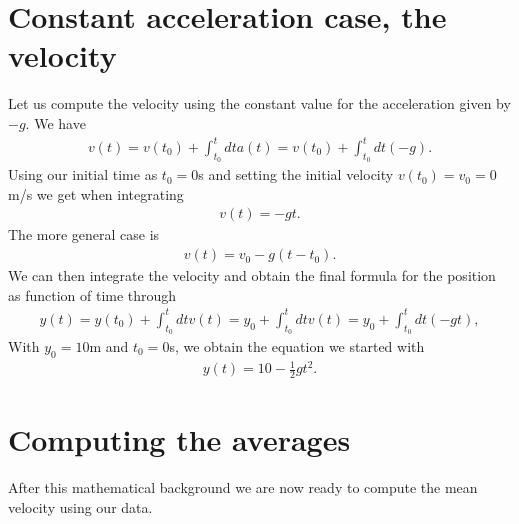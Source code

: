\documentclass[letterpaper,10pt,english]{sphinxmanual}
\begin{document}
\section{Constant acceleration case, the velocity}
\label{\detokenize{chapter1:constant-acceleration-case-the-velocity}}
Let us compute the velocity using the constant value for the acceleration given by \(-g\). We have
\begin{equation*}
\begin{split}
v(t)=v(t_0)+\int_{t_0}^t dt a(t)=v(t_0)+\int_{t_0}^t dt (-g).
\end{split}
\end{equation*}
Using our initial time as \(t_0=0\)s and setting the initial velocity \(v(t_0)=v_0=0\)m/s we get when integrating
\begin{equation*}
\begin{split}
v(t)=-gt.
\end{split}
\end{equation*}
The more general case is
\begin{equation*}
\begin{split}
v(t)=v_0-g(t-t_0).
\end{split}
\end{equation*}
We can then integrate the velocity and obtain the final formula for the position as function of time through
\begin{equation*}
\begin{split}
y(t)=y(t_0)+\int_{t_0}^t dt v(t)=y_0+\int_{t_0}^t dt v(t)=y_0+\int_{t_0}^t dt (-gt),
\end{split}
\end{equation*}
With \(y_0=10\)m and \(t_0=0\)s, we obtain the equation we started with
\begin{equation*}
\begin{split}
y(t)=10-\frac{1}{2}gt^2.
\end{split}
\end{equation*}

\section{Computing the averages}
\label{\detokenize{chapter1:computing-the-averages}}
After this mathematical background we are now ready to compute the mean velocity using our data.
\end{document}
